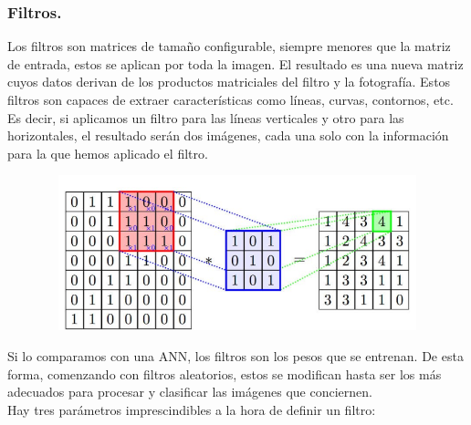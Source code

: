 \documentclass[a4paper,10pt]{article}
\begin{document}
\subsubsection{Filtros.}
Los filtros son matrices de tamaño configurable, siempre menores que la matriz de entrada, estos se aplican por toda la imagen. El resultado es una nueva matriz cuyos datos derivan de los productos matriciales del filtro y la fotografía. Estos filtros son capaces de extraer características como líneas, curvas, contornos, etc.  \\Es decir, si aplicamos un filtro para las líneas verticales y otro para las horizontales, el resultado serán dos imágenes, cada una solo con la información para la que hemos aplicado el filtro.
\begin{figure}[H]
\centering
\includegraphics[width=12.0cm, height=4.5cm]{Annotation 2020-04-13 191448.png}
\end{figure}
\noindent
Si lo comparamos con una ANN, los filtros son los pesos que se entrenan. De esta forma, comenzando con filtros aleatorios, estos se modifican hasta ser los más adecuados para procesar y clasificar las imágenes que conciernen.\\
Hay tres parámetros imprescindibles a la hora de definir un filtro:
\end{document}
